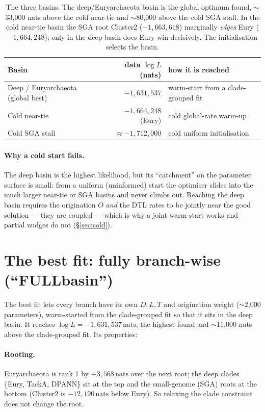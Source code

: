 \documentclass[11pt]{article}
\newcommand{\nats}{\,\text{nats}}
\begin{document}
\begin{table}[t]
\centering
\begin{tabular}{lrl}
\toprule
Basin & data $\log L$ (nats) & how it is reached \\
\midrule
Deep / Euryarchaeota (global best) & $-1{,}631{,}537$ & warm-start from a clade-grouped fit \\
Cold near-tie                      & $-1{,}664{,}248$ (Eury) & cold global-rate warm-up \\
Cold SGA stall                     & $\approx -1{,}712{,}000$ & cold uniform initialisation \\
\bottomrule
\end{tabular}
\caption{The three basins. The deep/Euryarchaeota basin is the global optimum found,
$\sim$33{,}000 nats above the cold near-tie and $\sim$80{,}000 above the cold SGA stall. In
the cold near-tie basin the SGA root Cluster2 ($-1{,}663{,}618$) marginally \emph{edges} Eury
($-1{,}664{,}248$); only in the deep basin does Eury win decisively. The initialisation
selects the basin.}
\label{tab:basins}
\end{table}

\paragraph{Why a cold start fails.} The deep basin is the highest likelihood, but its
``catchment'' on the parameter surface is small: from a uniform (uninformed) start the
optimiser slides into the much larger near-tie or SGA basins and never climbs out. Reaching
the deep basin requires the origination $O$ \emph{and} the DTL rates to be jointly near the
good solution --- they are coupled --- which is why a joint warm-start works and partial
nudges do not (\S\ref{sec:cold}).

\FloatBarrier
\section{The best fit: fully branch-wise (``FULLbasin'')}
\label{sec:bestfit}
The best fit lets every branch have its own $D,L,T$ and origination weight
($\sim$2{,}000 parameters), warm-started from the clade-grouped fit so that it sits in the
deep basin. It reaches $\log L = -1{,}631{,}537\nats$, the highest found and $\sim$11{,}000
nats above the clade-grouped fit. Its properties:

\paragraph{Rooting.} Euryarchaeota is rank 1 by $+3{,}568\nats$ over the next root; the deep
clades \{Eury, TackA, DPANN\} sit at the top and the small-genome (SGA) roots at the bottom
(Cluster2 is $-12{,}190\nats$ below Eury). So relaxing the clade constraint does not change
the root.
\end{document}
